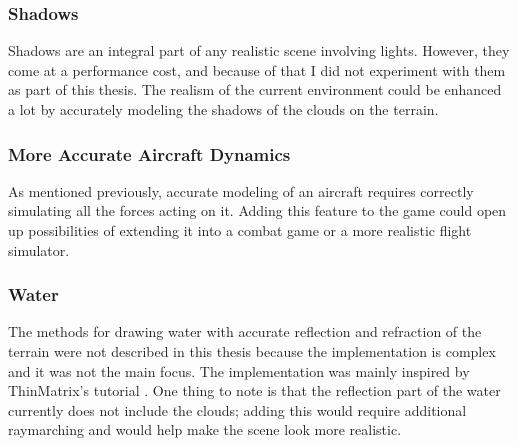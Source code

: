 \subsubsection{Shadows} Shadows are an integral part of any realistic scene involving lights. However, they come at a performance cost, and because of that I did not experiment with them as part of this thesis. The realism of the current environment could be enhanced a lot by accurately modeling the shadows of the clouds on the terrain.

\subsubsection{More Accurate Aircraft Dynamics} As mentioned previously, accurate modeling of an aircraft requires correctly simulating all the forces acting on it. Adding this feature to the game could open up possibilities of extending it into a combat game or a more realistic flight simulator.

\subsubsection{Water} The methods for drawing water with accurate reflection and refraction of the terrain were not described in this thesis because the implementation is complex and it was not the main focus. The implementation was mainly inspired by ThinMatrix's tutorial \cite{thin_matrix}. One thing to note is that the reflection part of the water currently does not include the clouds; adding this would require additional raymarching and would help make the scene look more realistic.